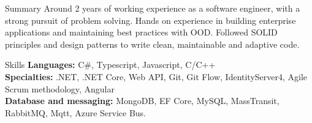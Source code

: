 \documentclass{resume}
\begin{document}

\begin{rSection}{Summary}
Around 2 years of working experience as a software engineer, with a strong pursuit of problem solving.
Hands on experience in building enterprise applications and maintaining best practices with OOD.
Followed SOLID principles and design patterns to write clean, maintainable and adaptive code.
\end{rSection}


\begin{rSection}{Skills}
{\bf Languages:} C\#, Typescript, Javascript, C/C++\\
{\bf Specialties:} .NET, .NET Core, Web API, Git, Git Flow, IdentityServer4, Agile Scrum methodology, Angular\\
{\bf Database and messaging:} MongoDB, EF Core, MySQL, MassTransit, RabbitMQ, Mqtt, Azure Service Bus.
\end{rSection}

\end{document}
